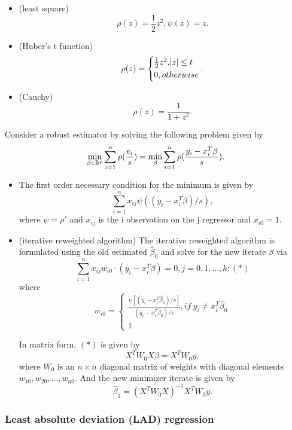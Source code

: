 \begin{refsection}
\begin{example}\hfill
	\begin{itemize}
		\item (least square) $$\rho(z) = \frac{1}{2}z^2, \psi(z) = z.$$
		\item (Huber's t function)
		$$\rho(z) = 
		\begin{cases*}
		\frac{1}{2}z^2, \abs{z} \leq t \\
		0, otherwise
		\end{cases*}.$$
		\item (Cauchy)
		$$\rho(z) = \frac{1}{1+z^2}.$$ 
	\end{itemize}
\end{example}



\begin{lemma}\cite[373]{montgomery2012introduction}
Consider a robust estimator by solving the following problem given by
$$\min_{\beta \in \mathbb{R}^p} \sum_{i=1}^{n} \rho(\frac{e_i}{s}) = \min_{\beta} \sum_{i=1}^{n} \rho(\frac{y_i - x_i^T\beta}{s}).$$
\begin{itemize}
	\item The first order necessary condition for the minimum is given by
	$$\sum_{i=1}^{n} x_{ij}\psi((y_i-x_i^T\beta)/s),$$
where $\psi = \rho'$ and $x_{ij}$ is the i observation on the j regressor and $x_{i0}=1$.	
\item (iterative reweighted algorithm) The iterative reweighted algorithm is formulated using the old estimated $\hat{\beta}_0$ and solve for the new iterate $\beta$ via
	$$\sum_{i=1}^{n} x_{ij}w_{i0}\cdot (y_i-x_i^T\beta) = 0, j=0,1,...,k; (*)$$
where 
$$w_{i0} = \begin{cases*}
\frac{\psi[(y_i-x_i^T\hat{\beta}_0)/s]}{(y_i-x_i^T\hat{\beta}_0)/s}, if~y_i\neq x_i^T\hat{\beta}_0 \\
1
\end{cases*}$$	

In matrix form, $(*)$ is given by
$$X^TW_0X\beta = X^TW_0y,$$
where $W_0$ is an $n\times n$ diagonal matrix of weights with diagonal elements $w_{10},w_{20},...,w_{n0}$. 
And the new minimizer iterate is given by
$$\hat{\beta}_1 = (X^TW_0X)^{-1}X^TW_0y.$$
\end{itemize}
\end{lemma}


\subsubsection{Least absolute deviation (LAD) regression}


\end{refsection}
